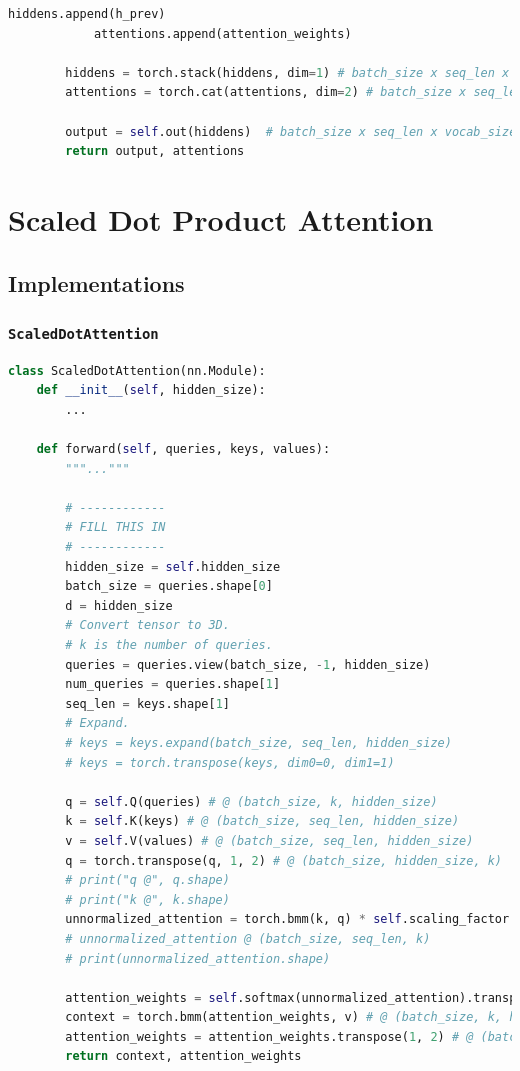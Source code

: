 \documentclass{article}
\begin{document}
\begin{lstlisting}[language=python]
            hiddens.append(h_prev)
            attentions.append(attention_weights)

        hiddens = torch.stack(hiddens, dim=1) # batch_size x seq_len x hidden_size
        attentions = torch.cat(attentions, dim=2) # batch_size x seq_len x seq_len
        
        output = self.out(hiddens)  # batch_size x seq_len x vocab_size
        return output, attentions
\end{lstlisting}
\section{Scaled Dot Product Attention}
\subsection{Implementations}
\subsubsection{\texttt{ScaledDotAttention}}
\begin{lstlisting}[language=python]
class ScaledDotAttention(nn.Module):
    def __init__(self, hidden_size):
        ...

    def forward(self, queries, keys, values):
    	"""..."""

        # ------------
        # FILL THIS IN
        # ------------
        hidden_size = self.hidden_size
        batch_size = queries.shape[0]
        d = hidden_size
        # Convert tensor to 3D.
        # k is the number of queries.
        queries = queries.view(batch_size, -1, hidden_size)
        num_queries = queries.shape[1]
        seq_len = keys.shape[1]
        # Expand.
        # keys = keys.expand(batch_size, seq_len, hidden_size)
        # keys = torch.transpose(keys, dim0=0, dim1=1)

        q = self.Q(queries) # @ (batch_size, k, hidden_size)
        k = self.K(keys) # @ (batch_size, seq_len, hidden_size)
        v = self.V(values) # @ (batch_size, seq_len, hidden_size)
        q = torch.transpose(q, 1, 2) # @ (batch_size, hidden_size, k)
        # print("q @", q.shape)
        # print("k @", k.shape)
        unnormalized_attention = torch.bmm(k, q) * self.scaling_factor
        # unnormalized_attention @ (batch_size, seq_len, k)
        # print(unnormalized_attention.shape)
    
        attention_weights = self.softmax(unnormalized_attention).transpose(1, 2) # @ (batch_size, k, seq_len)
        context = torch.bmm(attention_weights, v) # @ (batch_size, k, hidden_size)
        attention_weights = attention_weights.transpose(1, 2) # @ (batch_size, seq_len, k)
        return context, attention_weights
\end{lstlisting}
\end{document}
